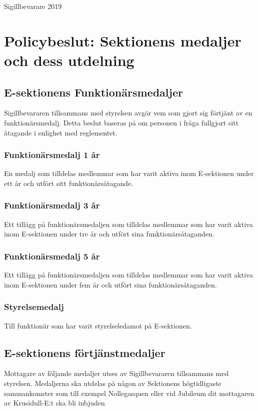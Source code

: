 \documentclass[../_main/handlingar.tex]{subfiles}
\begin{document}
\begin{signatures}{1}
    \mvh
    \signature{Matilda Horn}{Sigillbevarare 2019}
\end{signatures}

\newpage
\section*{Policybeslut: Sektionens medaljer och dess utdelning}

\subsection*{E-sektionens Funktionärsmedaljer}

Sigillbevararen tillsammans med styrelsen avgör vem som gjort sig förtjänt av en funktionärsmedalj. Detta beslut baseras på om personen i fråga fullgjort sitt åtagande i enlighet med reglementet.

\subsubsection*{Funktionärsmedalj 1 år}
En medalj som tilldelas medlemmar som har varit aktiva inom E-sektionen under ett år och utfört sitt funktionärsåtagande.

\subsubsection*{Funktionärsmedalj 3 år}
Ett tillägg på funktionärsmedaljen som tilldelas medlemmar som har varit aktiva inom E-sektionen under tre år och utfört sina funktionärsåtaganden.

\subsubsection*{Funktionärsmedalj 5 år}
Ett tillägg på funktionärsmedaljen som tilldelas medlemmar som har varit aktiva inom E-sektionen under fem år och utfört sina funktionärsåtaganden.

\subsubsection*{Styrelsemedalj}
Till funktionär som har varit styrelseledamot på E-sektionen.

\subsection*{E-sektionens förtjänstmedaljer}
Mottagare av följande medaljer utses av Sigillbevararen tillsammans med styrelsen. Medaljerna ska utdelas på någon av Sektionens högtidligaste sammankomster som till exempel Nollegasquen eller vid Jubileum dit mottagaren av Krusidull-E:t ska bli inbjuden
\end{document}
